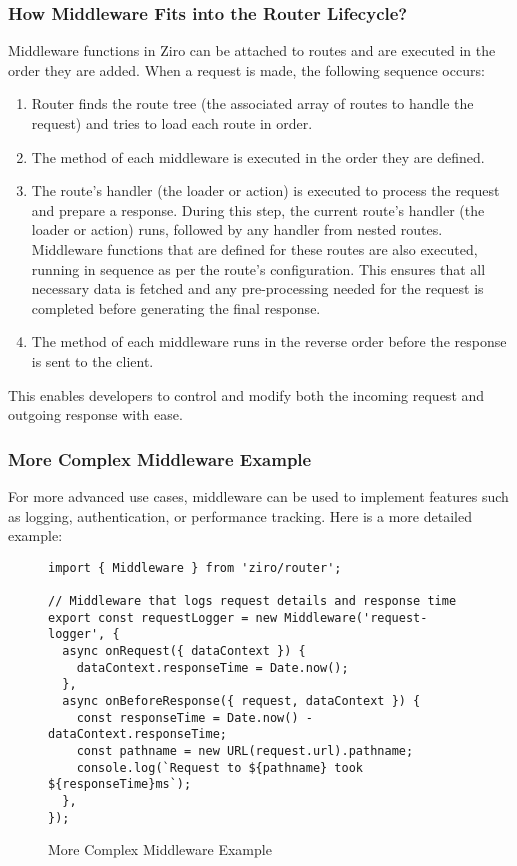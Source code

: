 \subsubsection*{How Middleware Fits into the Router Lifecycle?}
Middleware functions in Ziro can be attached to routes and are executed in the order they are added. When a request is made, the following sequence occurs:
\begin{enumerate}
  \item Router finds the route tree (the associated array of routes to handle the request) and tries to load each route in order.
  \item The  method of each middleware is executed in the order they are defined.
  \item The route’s handler (the loader or action) is executed to process the request and prepare a response. During this step, the current route's handler (the loader or action) runs, followed by any handler from nested routes. Middleware functions that are defined for these routes are also executed, running in sequence as per the route's configuration. This ensures that all necessary data is fetched and any pre-processing needed for the request is completed before generating the final response.
  \item The  method of each middleware runs in the reverse order before the response is sent to the client.
\end{enumerate}
This enables developers to control and modify both the incoming request and outgoing response with ease.

\pagebreak
\subsubsection*{More Complex Middleware Example}
For more advanced use cases, middleware can be used to implement features such as logging, authentication, or performance tracking. Here is a more detailed example:
\begin{figure}[h!]
\begin{verbatim}
import { Middleware } from 'ziro/router';

// Middleware that logs request details and response time
export const requestLogger = new Middleware('request-logger', {
  async onRequest({ dataContext }) {
    dataContext.responseTime = Date.now();
  },
  async onBeforeResponse({ request, dataContext }) {
    const responseTime = Date.now() - dataContext.responseTime;
    const pathname = new URL(request.url).pathname;
    console.log(`Request to ${pathname} took ${responseTime}ms`);
  },
});
\end{verbatim}
\caption{More Complex Middleware Example}
\end{figure}

